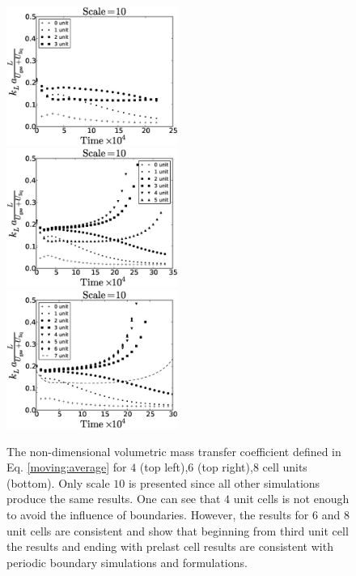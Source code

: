 \documentclass{article}
\begin{document}
\begin{figure}[htb!]
\includegraphics[width=0.5\textwidth]{Figures/aver_moving_window4scale10.eps}
\includegraphics[width=0.5\textwidth]{Figures/aver_moving_window6scale10.eps}\\
\includegraphics[width=0.5\textwidth]{Figures/aver_moving_window8scale10.eps}
\caption{The non-dimensional volumetric mass transfer coefficient defined in Eq.
\ref{moving:average} for $4$ (top left),$6$ (top right),$8$ cell units (bottom). Only scale
$10$ is presented since all other simulations produce the same results. One can see that $4$ unit
cells is not enough to avoid the influence of boundaries. However, the results for $6$ and $8$
unit cells are consistent and show that beginning from third unit cell the results and ending with
prelast cell results are consistent with periodic boundary simulations and
\citet{vanbaten-circular} formulations.
\label{fig:moving:average:ca0097}}
\end{figure}
\end{document}
